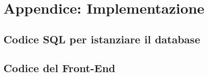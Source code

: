 \section{Appendice: Implementazione}

\subsection*{Codice SQL per istanziare il database}
%
%

\lstset{mathescape=false, escapechar=, style=customsql, title=cinemadb.sql}

\pagebreak

\subsection*{Codice del Front-End}
%
%

